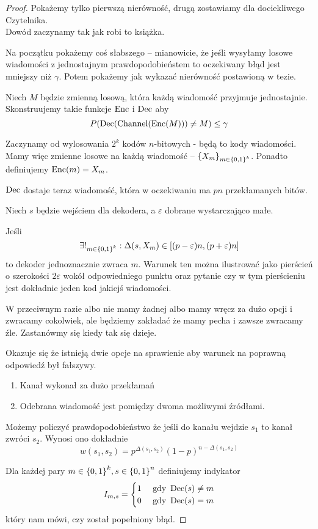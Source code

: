 \begin{proof}
	Pokażemy tylko pierwszą nierówność, drugą zostawiamy dla dociekliwego Czytelnika. \\
	Dowód zaczynamy tak jak robi to książka.

	Na początku pokażemy coś słabszego -- mianowicie, że jeśli wysyłamy losowe wiadomości z jednostajnym prawdopodobieństem to oczekiwany błąd jest mniejszy niż \( \gamma \).
	Potem pokażemy jak wykazać nierówność postawioną w tezie.

	Niech \( M \) będzie zmienną losową, która każdą wiadomość przyjmuje jednostajnie.
	Skonstruujemy takie funkcje \( \operatorname{Enc} \) i \( \operatorname{Dec} \) aby
	\[
		P\pars{\Dec(\Channel(\Enc(M))) \neq M} \leq \gamma
	\]

	Zaczynamy od wylosowania \( 2^k \) kodów \(n\)-bitowych - będą to kody wiadomości.
	Mamy więc zmienne losowe na każdą wiadomość -- \( \set{X_m}_{m \in \set{0, 1}^k} \).
	Ponadto definiujemy \( \operatorname{Enc}(m) = X_m \).

	\( \operatorname{Dec} \) dostaje teraz wiadomość, która w oczekiwaniu ma \( pn \) przekłamanych bitów.

	Niech \( s \) będzie wejściem dla dekodera, a \( \varepsilon \) dobrane wystarczająco małe.

	Jeśli
	\[
		\exists!_{m \in \set{0, 1}^k} : \Delta(s, X_m) \in \brackets{(p-\varepsilon)n, (p+\varepsilon)n}
	\]
	to dekoder jednoznacznie zwraca \( m \).
	Warunek ten można ilustrować jako pierścień o szerokości \( 2\varepsilon \) wokół odpowiedniego punktu oraz pytanie czy w tym pierścieniu jest dokładnie jeden kod jakiejś wiadomości.

	W przeciwnym razie albo nie mamy żadnej albo mamy wręcz za dużo opcji i zwracamy cokolwiek, ale będziemy zakładać że mamy pecha i zawsze zwracamy źle.
	Zastanówmy się kiedy tak się dzieje.

	Okazuje się że istnieją dwie opcje na sprawienie aby warunek na poprawną odpowiedź był fałszywy.
	\begin{enumerate}
		\item Kanał wykonał za dużo przekłamań
		\item Odebrana wiadomość jest pomiędzy dwoma możliwymi źródłami.
	\end{enumerate}

	Możemy policzyć prawdopodobieństwo że jeśli do kanału wejdzie \( s_1 \) to kanał zwróci \( s_2 \).
	Wynosi ono dokładnie
	\[
		w(s_1, s_2) = p^{\Delta(s_1, s_2)} (1-p)^{n - \Delta(s_1, s_2)}
	\]

	Dla każdej pary \(m \in \set{0, 1}^k, s \in \set{0, 1}^n \) definiujemy indykator
	\[
		I_{m, s} = \begin{cases}
			1 & \text{ gdy } \operatorname{Dec}(s) \neq m \\
			0 & \text{ gdy } \operatorname{Dec}(s) = m
		\end{cases}
	\]
	który nam mówi, czy został popełniony błąd.


\end{proof}
